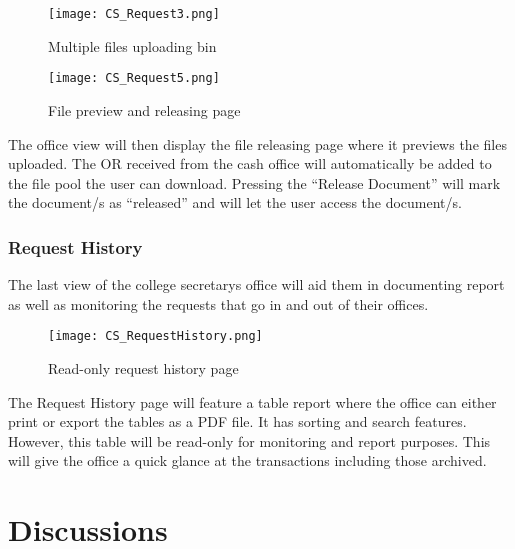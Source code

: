 \begin{figure}[h]
    \centering 
    \begin{minipage}[c]{0.5\linewidth}
        \centering
        \texttt{[image: CS\_Request3.png]}
        \caption{Multiple files uploading bin}
        \label{fig:CS_Request3}
    \end{minipage}\hfill
    \begin{minipage}[c]{0.5\linewidth}
        \centering
        \texttt{[image: CS\_Request5.png]}
        \caption{File preview and releasing page}
        \label{fig:CS_Request5}
    \end{minipage}
\end{figure}

The office view will then display the file releasing page where it previews the files uploaded. The OR received from the cash office will automatically be added to the file pool the user can download. Pressing the “Release Document” will mark the document/s as “released” and will let the user access the document/s.

\subsubsection{Request History}

The last view of the college secretary\textsc{}s office will aid them in documenting report as well as monitoring the requests that go in and out of their offices.

\begin{figure}[h]
    \centering 
    \begin{minipage}[c]{0.5\linewidth}
        \centering
        \texttt{[image: CS\_RequestHistory.png]}
        \caption{Read-only request history page}
        \label{fig:CS_RequestHistory}
    \end{minipage}
\end{figure}

The Request History page will feature a table report where the office can either print or export the tables as a PDF file. It has sorting and search features. However, this table will be read-only for monitoring and report purposes. This will give the office a quick glance at the transactions including those archived.

\section{Discussions}

